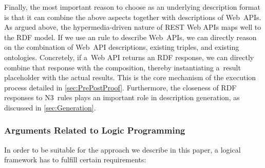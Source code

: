 Finally, the most important reason to choose \nthree as an underlying description format
is that it can combine the above aspects together with descriptions of Web~APIs.
As argued above, the hypermedia-driven nature of REST Web APIs maps well to the RDF model.
If we use an \nthree rule to describe Web~APIs,
we can directly reason on the combination of Web~API descriptions,
existing triples, and existing ontologies.
Concretely, if a~Web API returns an RDF response,
we can directly combine that response with the composition,
thereby instantiating a~result placeholder with the actual results.
This is the core mechanism of the execution process
detailed in \cref{sec:PrePostProof}.
Furthermore, the closeness of RDF responses to N3~rules
plays an important role in description generation,
as discussed in \cref{sec:Generation}.

\subsubsection{Arguments Related to Logic Programming}
In order to be suitable for the approach we describe in this paper, a logical framework has to fulfill certain requirements:

